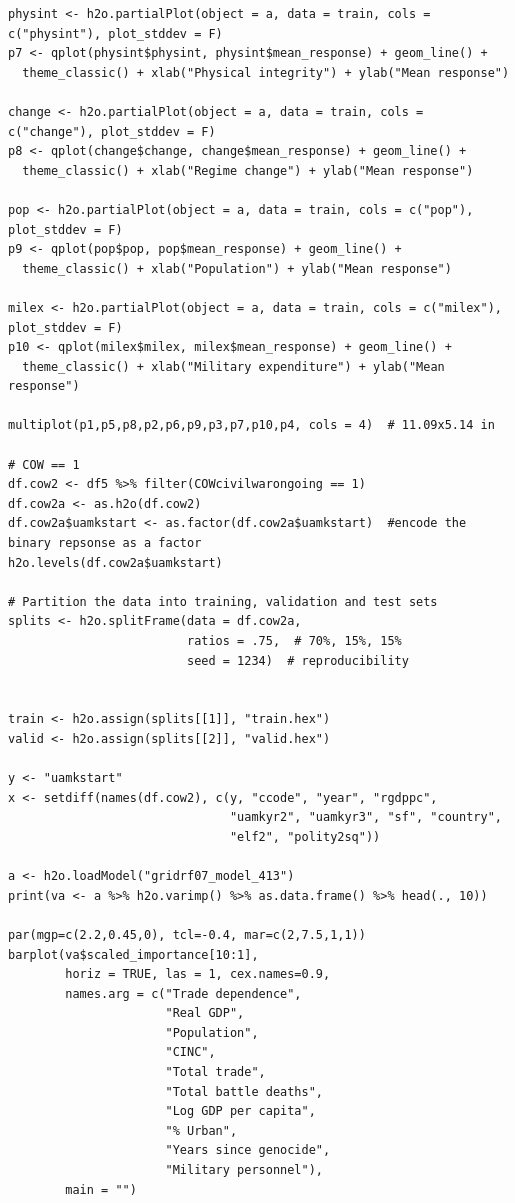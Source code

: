 \begin{verbatim}
physint <- h2o.partialPlot(object = a, data = train, cols = c("physint"), plot_stddev = F)
p7 <- qplot(physint$physint, physint$mean_response) + geom_line() +
  theme_classic() + xlab("Physical integrity") + ylab("Mean response")

change <- h2o.partialPlot(object = a, data = train, cols = c("change"), plot_stddev = F)
p8 <- qplot(change$change, change$mean_response) + geom_line() +
  theme_classic() + xlab("Regime change") + ylab("Mean response")

pop <- h2o.partialPlot(object = a, data = train, cols = c("pop"), plot_stddev = F)
p9 <- qplot(pop$pop, pop$mean_response) + geom_line() +
  theme_classic() + xlab("Population") + ylab("Mean response")

milex <- h2o.partialPlot(object = a, data = train, cols = c("milex"), plot_stddev = F)
p10 <- qplot(milex$milex, milex$mean_response) + geom_line() +
  theme_classic() + xlab("Military expenditure") + ylab("Mean response")

multiplot(p1,p5,p8,p2,p6,p9,p3,p7,p10,p4, cols = 4)  # 11.09x5.14 in

# COW == 1
df.cow2 <- df5 %>% filter(COWcivilwarongoing == 1)
df.cow2a <- as.h2o(df.cow2)
df.cow2a$uamkstart <- as.factor(df.cow2a$uamkstart)  #encode the binary repsonse as a factor
h2o.levels(df.cow2a$uamkstart)

# Partition the data into training, validation and test sets
splits <- h2o.splitFrame(data = df.cow2a, 
                         ratios = .75,  # 70%, 15%, 15%
                         seed = 1234)  # reproducibility


train <- h2o.assign(splits[[1]], "train.hex")   
valid <- h2o.assign(splits[[2]], "valid.hex") 

y <- "uamkstart"
x <- setdiff(names(df.cow2), c(y, "ccode", "year", "rgdppc",
                               "uamkyr2", "uamkyr3", "sf", "country",
                               "elf2", "polity2sq")) 

a <- h2o.loadModel("gridrf07_model_413")
print(va <- a %>% h2o.varimp() %>% as.data.frame() %>% head(., 10)) 

par(mgp=c(2.2,0.45,0), tcl=-0.4, mar=c(2,7.5,1,1))
barplot(va$scaled_importance[10:1],
        horiz = TRUE, las = 1, cex.names=0.9,
        names.arg = c("Trade dependence",
                      "Real GDP",
                      "Population",
                      "CINC",
                      "Total trade",
                      "Total battle deaths",
                      "Log GDP per capita",
                      "% Urban", 
                      "Years since genocide", 
                      "Military personnel"),
        main = "")


\end{verbatim}
